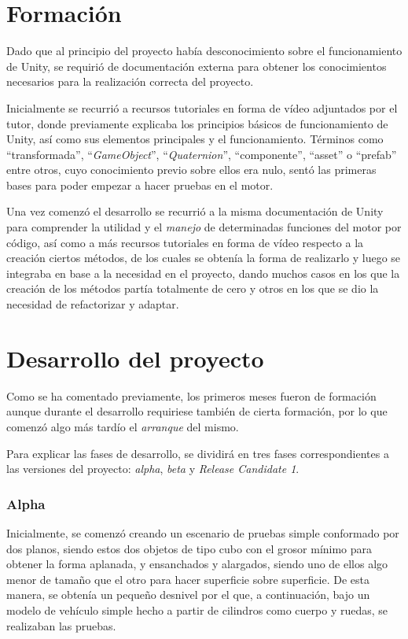 \section{Formación}

Dado que al principio del proyecto había desconocimiento sobre el funcionamiento de Unity, se requirió de documentación externa para obtener los conocimientos necesarios para la realización correcta del proyecto.

Inicialmente se recurrió a recursos tutoriales en forma de vídeo adjuntados por el tutor, donde previamente explicaba los principios básicos de funcionamiento de Unity, así como sus elementos principales y el funcionamiento. Términos como ``transformada'', ``\textit{GameObject}'', ``\textit{Quaternion}'', ``componente'', ``asset'' o ``prefab'' entre otros, cuyo conocimiento previo sobre ellos era nulo, sentó las primeras bases para poder empezar a hacer pruebas en el motor.

Una vez comenzó el desarrollo se recurrió a la misma documentación de Unity para comprender la utilidad y el \textit{manejo} de determinadas funciones del motor por código, así como a más recursos tutoriales en forma de vídeo respecto a la creación ciertos métodos, de los cuales se obtenía la forma de realizarlo y luego se integraba en base a la necesidad en el proyecto, dando muchos casos en los que la creación de los métodos partía totalmente de cero y otros en los que se dio la necesidad de refactorizar y adaptar.

\section{Desarrollo del proyecto}

Como se ha comentado previamente, los primeros meses fueron de formación aunque durante el desarrollo requiriese también de cierta formación, por lo que comenzó algo más tardío el \textit{arranque} del mismo.

Para explicar las fases de desarrollo, se dividirá en tres fases correspondientes a las versiones del proyecto: \textit{alpha}, \textit{beta} y \textit{Release Candidate 1}.

\subsubsection{Alpha}

Inicialmente, se comenzó creando un escenario de pruebas simple conformado por dos planos, siendo estos dos objetos de tipo cubo con el grosor mínimo para obtener la forma aplanada, y ensanchados y alargados, siendo uno de ellos algo menor de tamaño que el otro para hacer superficie sobre superficie. De esta manera, se obtenía un pequeño desnivel por el que, a continuación, bajo un modelo de vehículo simple hecho a partir de cilindros como cuerpo y ruedas, se realizaban las pruebas.

